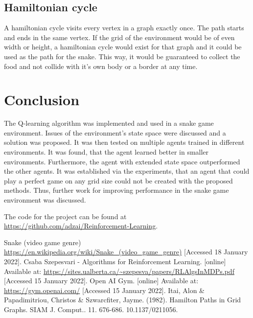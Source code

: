 \documentclass[lettersize,journal]{IEEEtran}
\begin{document}
\subsection{Hamiltonian cycle}
A hamiltonian cycle visits every vertex in a graph exactly once.
The path starts and ends in the same vertex.
If the grid of the environment would be of even width or height,
a hamiltonian cycle would exist for that graph \cite{cycle} and it could be
used as the path for the snake. This way, it would be guaranteed
to collect the food and not collide with it's own body or a border
at any time.

\section{Conclusion}
The Q-learning algorithm was implemented and used in a snake game
environment. Issues of the environment's state space were discussed
and a solution was proposed. It was then tested on multiple agents
trained in different environments. It was found, that the agent
learned better in smaller environments. Furthermore, the agent
with extended state space outperformed the other agents.
It was established via the experiments, that an agent that could play a perfect
game on any grid size could not be created with the proposed methods.
Thus, further work for improving performance in the snake game environment was discussed.

The code for the project can be found at \url{https://github.com/adzai/Reinforcement-Learning}.

\begin{thebibliography}{1}
    Snake (video game genre) \url{https://en.wikipedia.org/wiki/Snake_(video_game_genre)} [Accessed 18 January 2022].
    Csaba Szepesvari - Algorithms for Reinforcement Learning. [online] Available at: \url{https://sites.ualberta.ca/~szepesva/papers/RLAlgsInMDPs.pdf} [Accessed 15 January 2022].
    Open AI Gym. [online] Available at: \url{https://gym.openai.com/} [Accessed 15 January 2022].
Itai, Alon \& Papadimitriou, Christos \& Szwarcfiter, Jayme. (1982). Hamilton Paths in Grid Graphs. SIAM J. Comput.. 11. 676-686. 10.1137/0211056.
\end{thebibliography}
\end{document}
